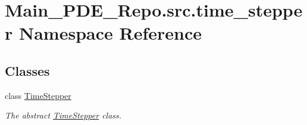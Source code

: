 \hypertarget{namespaceMain__PDE__Repo_1_1src_1_1time__stepper}{}\section{Main\+\_\+\+P\+D\+E\+\_\+\+Repo.\+src.\+time\+\_\+stepper Namespace Reference}
\label{namespaceMain__PDE__Repo_1_1src_1_1time__stepper}
\subsection*{Classes}
\begin{DoxyCompactItemize}
\item 
class \hyperlink{classMain__PDE__Repo_1_1src_1_1time__stepper_1_1TimeStepper}{Time\+Stepper}
\begin{DoxyCompactList}\small\item\em The abstract \hyperlink{classMain__PDE__Repo_1_1src_1_1time__stepper_1_1TimeStepper}{Time\+Stepper} class. \end{DoxyCompactList}\end{DoxyCompactItemize}
